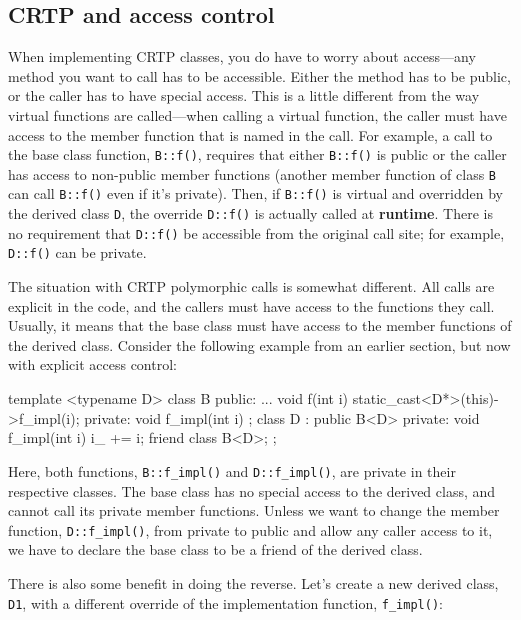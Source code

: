 \subsection{CRTP and access control}

When implementing CRTP classes, you do have to worry about access---any method you want to call has to be accessible. Either the method has to be public, or the caller has to have special access. This is a little different from the way virtual functions are called---when calling a virtual function, the caller must have access to the member function that is named in the call. For example, a call to the base class function, \texttt{B::f()}, requires that either \texttt{B::f()} is public or the caller has access to non-public member functions (another member function of class \texttt{B} can call \texttt{B::f()} even if it's private). Then, if \texttt{B::f()} is virtual and overridden by the derived class \texttt{D}, the override \texttt{D::f()} is actually called at \textbf{runtime}. There is no requirement that \texttt{D::f()} be accessible from the original call site; for example, \texttt{D::f()} can be private.

The situation with CRTP polymorphic calls is somewhat different. All calls are explicit in the code, and the callers must have access to the functions they call. Usually, it means that the base class must have access to the member functions of the derived class. Consider the following example from an earlier section, but now with explicit access control:

\begin{code}
template <typename D> class B {
  public:
  ...
  void f(int i) { static_cast<D*>(this)->f_impl(i); }
  private:
  void f_impl(int i) {}
};
class D : public B<D> {
  private:
  void f_impl(int i) { i_ += i; }
  friend class B<D>;
};
\end{code}

Here, both functions, \texttt{B::f\_impl()} and \texttt{D::f\_impl()}, are private in their respective classes. The base class has no special access to the derived class, and cannot call its private member functions. Unless we want to change the member function, \texttt{D::f\_impl()}, from private to public and allow any caller access to it, we have to declare the base class to be a friend of the derived class.

There is also some benefit in doing the reverse. Let's create a new derived class, \texttt{D1}, with a different override of the implementation function, \texttt{f\_impl()}:

